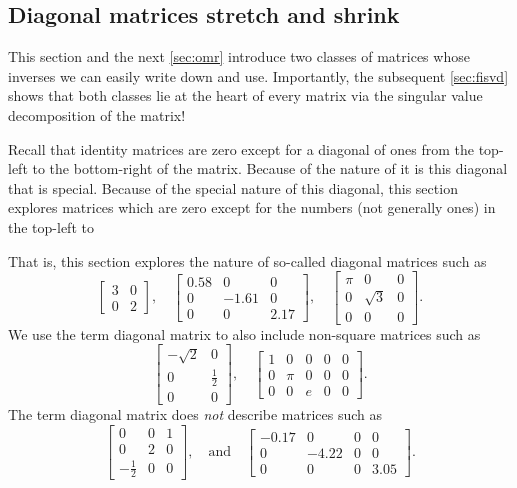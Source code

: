 \subsection{Diagonal matrices stretch and shrink}
\label{sec:dmd}

This section and the next \cref{sec:omr} introduce two classes of matrices whose inverses we can easily write down and use.
Importantly, the subsequent \cref{sec:fisvd} shows that both classes lie at the heart of every matrix via the singular value decomposition of the matrix!

Recall that identity matrices are zero except for a diagonal of ones from the top-left to the bottom-right of the matrix.
Because of the nature of  it is this diagonal that is special.
Because of the special nature of this diagonal, this section explores matrices which are zero except for the numbers (not generally ones) in the top-left to 

\begin{example} \label{eg:4diag}
That is, this section explores the nature of so-called diagonal matrices such as
\begin{equation*}
\begin{bmatrix} 3&0\\0&2 \end{bmatrix},\quad
\begin{bmatrix} 0.58&0&0\\0&-1.61&0\\0&0&2.17 \end{bmatrix},\quad
\begin{bmatrix} \pi&0&0\\0&\sqrt3&0\\0&0&0 \end{bmatrix}.
\end{equation*}
We use the term {diagonal matrix} to also include non-square matrices such as
\begin{equation*}
\begin{bmatrix} -\sqrt2&0\\0&\frac12\\0&0 \end{bmatrix},\quad
\begin{bmatrix} 1&0&0&0&0\\0&\pi&0&0&0\\0&0&e&0&0 \end{bmatrix}.
\end{equation*}
The term diagonal matrix does \emph{not} describe matrices such as
\begin{equation*}
\begin{bmatrix} 0&0&1\\0&2&0\\-\frac12&0&0  \end{bmatrix}
,\quad\text{and}\quad
\begin{bmatrix} -0.17&0&0&0\\0&-4.22&0&0\\0&0&0&3.05 \end{bmatrix}.
\end{equation*}
\end{example}

